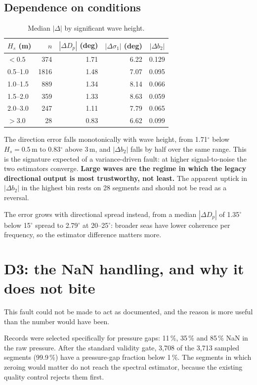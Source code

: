 \documentclass[11pt]{article}
\begin{document}
\subsection*{Dependence on conditions}

\begin{table}[htbp]
  \centering
  \caption{Median $|\Delta|$ by significant wave height.}
  \begin{tabular}{@{}lrrrr@{}}
    \toprule
    $H_s$ (m) & $n$ & $|\Delta D_p|$ (deg) & $|\Delta\sigma_1|$ (deg) & $|\Delta b_2|$ \\
    \midrule
    $<0.5$    &  374 & 1.71 & 6.22 & 0.129 \\
    0.5--1.0  & 1816 & 1.48 & 7.07 & 0.095 \\
    1.0--1.5  &  889 & 1.34 & 8.14 & 0.066 \\
    1.5--2.0  &  359 & 1.33 & 8.63 & 0.059 \\
    2.0--3.0  &  247 & 1.11 & 7.79 & 0.065 \\
    $>3.0$    &   28 & 0.83 & 6.62 & 0.099 \\
    \bottomrule
  \end{tabular}
\end{table}

The direction error falls monotonically with wave height, from 1.71$^\circ$ below
$H_s = 0.5$\,m to 0.83$^\circ$ above 3\,m, and $|\Delta b_2|$ falls by half over
the same range. This is the signature expected of a variance-driven fault: at
higher signal-to-noise the two estimators converge. \textbf{Large waves are the
regime in which the legacy directional output is most trustworthy, not least.}
The apparent uptick in $|\Delta b_2|$ in the highest bin rests on 28 segments and
should not be read as a reversal.

The error grows with directional spread instead, from a median
$|\Delta D_p|$ of 1.35$^\circ$ below 15$^\circ$ spread to 2.79$^\circ$ at
20--25$^\circ$: broader seas have lower coherence per frequency, so the
estimator difference matters more.

\section{D3: the NaN handling, and why it does not bite}

This fault could not be made to act as documented, and the reason is more useful
than the number would have been.

Records were selected specifically for pressure gaps: 11\,\%, 35\,\% and
85\,\% NaN in the raw pressure. After the standard validity gate, 3{,}708 of
the 3{,}713 sampled segments (99.9\,\%) have a pressure-gap fraction below
1\,\%. The segments in
which zeroing would matter do not reach the spectral estimator, because the
existing quality control rejects them first.
\end{document}
